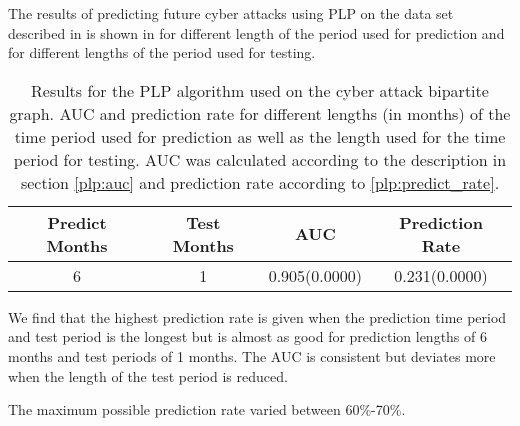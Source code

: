 The results of predicting future cyber attacks using PLP on the data set described in  is shown in  for different length of the period used for prediction and for different lengths of the period used for testing.
\begin{table}[!ht]
    \centering
    \begin{tabular}{|c|c|c|c|} \hline
    Predict Months    &   Test Months    &   AUC    &   Prediction Rate \\ \hline
    6   &   1   &   0.905(0.0000)   &   0.231(0.0000) \\ \hline

    \end{tabular}
    \caption{\label{fig:plp_results} Results for the PLP algorithm used on the cyber attack bipartite graph. AUC and prediction rate for different lengths (in months) of the time period used for prediction as well as the length used for the time period for testing. AUC was calculated according to the description in section \ref{plp:auc} and prediction rate according to \ref{plp:predict_rate}.}
\end{table}

We find that the highest prediction rate is given when the prediction time period and test period is the longest but is almost as good for prediction lengths of 6 months and test periods of 1 months. The AUC is consistent but deviates more when the length of the test period is reduced.

The maximum possible prediction rate varied between 60\%-70\%.
